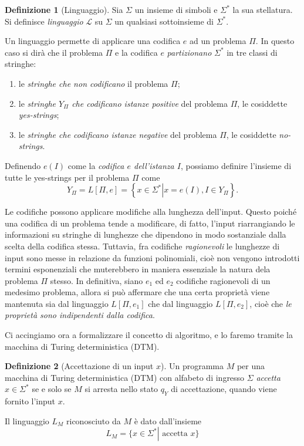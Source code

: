 \documentclass[10pt]{\classname}
\theoremstyle{newlinethm}
\theoremstyle{theorem}
\theoremstyle{definition}
\newtheorem{definizione}{Definizione}[section]
\theoremstyle{definition}
\theoremstyle{definition}
\theoremstyle{definition}
\begin{document}
\begin{definizione}[Linguaggio]
    Sia $\Sigma$ un insieme di simboli e $\Sigma^*$ la sua stellatura. Si definisce \emph{linguaggio} $\mathcal L$ su $\Sigma$ un qualsiasi sottoinsieme di $\Sigma^*$.
\end{definizione}
Un linguaggio permette di applicare una codifica $e$ ad un problema $\Pi$. In questo caso si dirà che il problema $\Pi$ e la codifica $e$ \emph{partizionano} $\Sigma^*$ in tre classi di stringhe:
\begin{enumerate}
    \item le \emph{stringhe che non codificano} il problema $\Pi$;
    \item le \emph{stringhe $Y_\Pi$ che codificano istanze positive} del problema $\Pi$, le cosiddette \emph{yes-strings};
    \item le \emph{stringhe che codificano istanze negative} del problema $\Pi$, le cosiddette \emph{no-strings}.
\end{enumerate}
Definendo $e(I)$ come la \emph{codifica $e$ dell'istanza $I$}, possiamo definire l'insieme di tutte le yes-strings per il problema $\Pi$ come \[Y_\Pi = L[\Pi, e] = \left\{x \in \Sigma^* \left|\right. x = e(I), I \in Y_\Pi\right\}.\]

Le codifiche possono applicare modifiche alla lunghezza dell'input. Questo poiché una codifica di un problema tende a modificare, di fatto, l'input riarrangiando le informazioni su stringhe di lunghezze che dipendono in modo sostanziale dalla scelta della codifica stessa. Tuttavia, fra codifiche \emph{ragionevoli} le lunghezze di input sono messe in relazione da funzioni polinomiali, cioè non vengono introdotti termini esponenziali che muterebbero in maniera essenziale la natura dela problema $\Pi$ stesso. In definitiva, siano $e_1$ ed $e_2$ codifiche ragionevoli di un medesimo problema, allora si può affermare che una certa proprietà viene mantenuta sia dal linguaggio $L[\Pi, e_1]$ che dal linguaggio $L[\Pi, e_2]$, cioè che \emph{le proprietà sono indipendenti dalla codifica}.

Ci accingiamo ora a formalizzare il concetto di algoritmo, e lo faremo tramite la macchina di Turing deterministica (DTM).

\begin{definizione}[Accettazione di un input $x$]
    Un programma $M$ per una macchina di Turing deterministica (DTM) con alfabeto di ingresso $\Sigma$ \emph{accetta $x \in \Sigma^*$} se e solo se $M$ si arresta nello stato $q_Y$ di accettazione, quando viene fornito l'input $x$.

    Il linguaggio $L_M$ riconosciuto da $M$ è dato dall'insieme \[L_M = \{x \in \Sigma^* \left|\right. \mbox{ accetta } x\}\]
\end{definizione}
\end{document}
